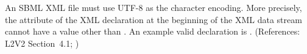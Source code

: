 An SBML XML file must use UTF-8 as the character encoding.  More
precisely, the  attribute of the XML declaration
at the beginning of the XML data stream cannot have a value other
than .  An example valid declaration is .  (References: L2V2
Section~4.1; )

